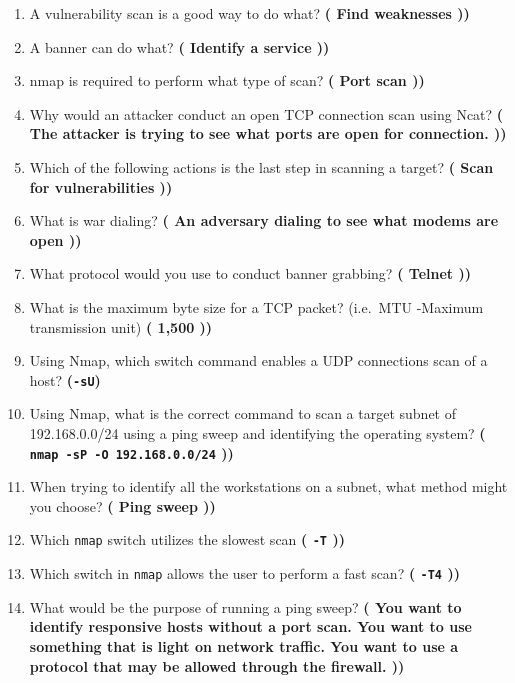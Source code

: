 \begin{enumerate}
    \item A vulnerability scan is a good way to do what? \textbf{\left( Find weaknesses \right))}
    \item A banner can do what? \textbf{\left( Identify a service \right))}
    \item nmap is required to perform what type of scan? \textbf{\left( Port scan \right))}
    \item Why would an attacker conduct an open TCP connection scan using Ncat? \textbf{\left( The attacker is trying to see what ports are open for connection. \right))}
    \item Which of the following actions is the last step in scanning a target? \textbf{\left( Scan for vulnerabilities \right))}
    \item What is war dialing? \textbf{\left( An adversary dialing to see what modems are open \right))}
    \item What protocol would you use to conduct banner grabbing? \textbf{\left( Telnet \right))}
    \item What is the maximum byte size for a TCP packet? (i.e.\ MTU -Maximum transmission unit) \textbf{\left( 1,500 \right))}
    \item Using Nmap, which switch command enables a UDP connections scan of a host? \textbf{(\verb|-sU|)}
    \item Using Nmap, what is the correct command to scan a target subnet of 192.168.0.0/24 using a ping sweep and identifying the operating system? \textbf{\left( \verb|nmap -sP -O 192.168.0.0/24| \right))}
    \item When trying to identify all the workstations on a subnet, what method might you choose? \textbf{\left( Ping sweep \right))}
    \item Which \verb|nmap| switch utilizes the slowest scan \textbf{\left( \verb|-T| \right))}
    \item Which switch in \verb|nmap| allows the user to perform a fast scan? \textbf{\left( \verb|-T4| \right))}
    \item What would be the purpose of running a ping sweep? \textbf{\left( You want to identify responsive hosts without a port scan.
    You want to use something that is light on network traffic.
    You want to use a protocol that may be allowed through the firewall. \right))}
\end{enumerate}

